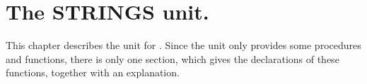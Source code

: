 %
%
%
%
%
\chapter{The STRINGS unit.}
This chapter describes the  unit for 
\fpc. 
Since the unit only provides some procedures and functions, there is
only one section, which gives the declarations of these functions, together
with an explanation. 
